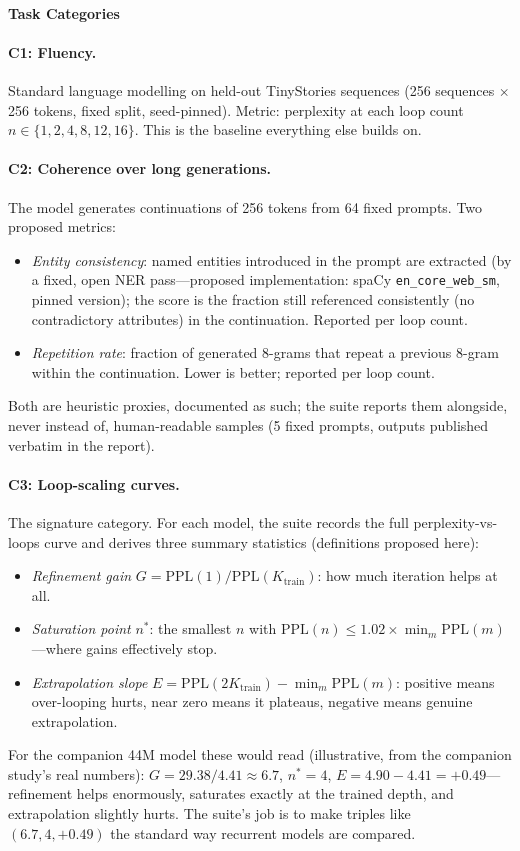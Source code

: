 \paragraph{Task Categories}

\paragraph{C1: Fluency.} Standard language modelling on held-out
TinyStories sequences (256 sequences $\times$ 256 tokens, fixed
split, seed-pinned). Metric: perplexity at each loop count
$n \in \{1, 2, 4, 8, 12, 16\}$. This is the baseline everything else
builds on.

\paragraph{C2: Coherence over long generations.} The model generates
continuations of 256 tokens from 64 fixed prompts. Two proposed
metrics:
\begin{itemize}
\item \emph{Entity consistency}: named entities introduced in the
prompt are extracted (by a fixed, open NER pass---proposed
implementation: spaCy \texttt{en\_core\_web\_sm}, pinned version);
the score is the fraction still referenced consistently (no
contradictory attributes) in the continuation. Reported per loop
count.
\item \emph{Repetition rate}: fraction of generated 8-grams that
repeat a previous 8-gram within the continuation. Lower is better;
reported per loop count.
\end{itemize}
Both are heuristic proxies, documented as such; the suite reports
them alongside, never instead of, human-readable samples (5 fixed
prompts, outputs published verbatim in the report).

\paragraph{C3: Loop-scaling curves.} The signature category. For each
model, the suite records the full perplexity-vs-loops curve and
derives three summary statistics (definitions proposed here):
\begin{itemize}
\item \emph{Refinement gain} $G = \mathrm{PPL}(1)/\mathrm{PPL}(K_{\mathrm{train}})$:
how much iteration helps at all.
\item \emph{Saturation point} $n^*$: the smallest $n$ with
$\mathrm{PPL}(n) \leq 1.02 \times \min_m \mathrm{PPL}(m)$---where
gains effectively stop.
\item \emph{Extrapolation slope} $E = \mathrm{PPL}(2K_{\mathrm{train}})
- \min_m \mathrm{PPL}(m)$: positive means over-looping hurts, near
zero means it plateaus, negative means genuine extrapolation.
\end{itemize}
For the companion 44M model these would read (illustrative, from the
companion study's real numbers): $G = 29.38/4.41 \approx 6.7$,
$n^* = 4$, $E = 4.90 - 4.41 = +0.49$---refinement helps enormously,
saturates exactly at the trained depth, and extrapolation slightly
hurts. The suite's job is to make triples like $(6.7, 4, +0.49)$
the standard way recurrent models are compared.

